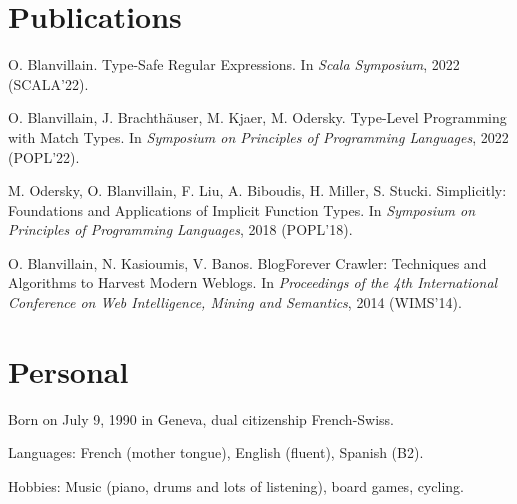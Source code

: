 \documentclass[marginmode, 11pt]{res}
\renewcommand{\:}[0]{:~}
\begin{document}
\begin{resume}
\section{Publications}

O. Blanvillain. Type-Safe Regular Expressions. In \emph{Scala Symposium}, 2022 (SCALA'22).

O. Blanvillain, J. Brachthäuser, M. Kjaer, M. Odersky. Type-Level Programming with Match Types. In \emph{Symposium on Principles of Programming Languages}, 2022 (POPL'22).

M. Odersky, O. Blanvillain, F. Liu, A. Biboudis, H. Miller, S. Stucki. Simplicitly: Foundations and Applications of Implicit Function Types. In \emph{Symposium on Principles of Programming Languages}, 2018 (POPL'18).

O. Blanvillain, N. Kasioumis, V. Banos. BlogForever Crawler: Techniques and Algorithms to Harvest Modern Weblogs. In \emph{Proceedings of the 4th International Conference on Web Intelligence, Mining and Semantics}, 2014 (WIMS'14).

\section{Personal}

Born on July 9, 1990 in Geneva, dual citizenship French-Swiss.

Languages: French (mother tongue), English (fluent), Spanish (B2).

Hobbies: Music (piano, drums and lots of listening), board
games, cycling.

\end{resume}
\end{document}

